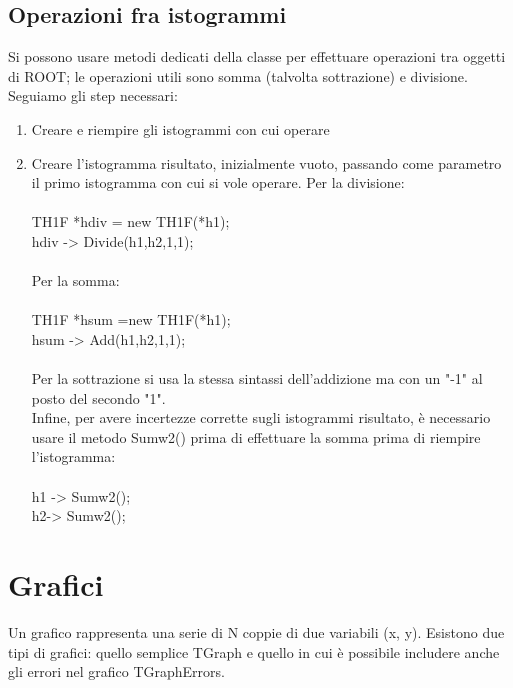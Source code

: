 \documentclass[10pt,a4paper]{article}
\begin{document}
\subsection{Operazioni fra istogrammi}
Si possono usare metodi dedicati della classe per effettuare operazioni tra oggetti di ROOT; le operazioni utili sono somma (talvolta sottrazione) e divisione. Seguiamo gli step necessari:
\begin{enumerate}
	\item Creare e riempire gli istogrammi con cui operare
	\item Creare l'istogramma risultato, inizialmente vuoto, passando come parametro il primo istogramma con cui si vole operare. Per la divisione:\\\\
	TH1F *hdiv = new TH1F(*h1);\\
	hdiv -> Divide(h1,h2,1,1);\\\\
	Per la somma:\\\\
	TH1F *hsum =new TH1F(*h1);\\
	hsum -> Add(h1,h2,1,1);\\\\
	Per la sottrazione si usa la stessa sintassi dell'addizione ma con un "-1" al posto del secondo "1".\\
	Infine, per avere incertezze corrette sugli istogrammi risultato, è necessario usare il metodo Sumw2() prima di effettuare la somma prima di riempire l'istogramma:\\\\
	h1 -> Sumw2();\\
	h2-> Sumw2();\\
\end{enumerate}

\section{Grafici}
Un grafico rappresenta una serie di N coppie di due variabili (x, y). Esistono due tipi di grafici: quello semplice TGraph e quello in cui è possibile includere anche gli errori nel grafico TGraphErrors. 
\end{document}

